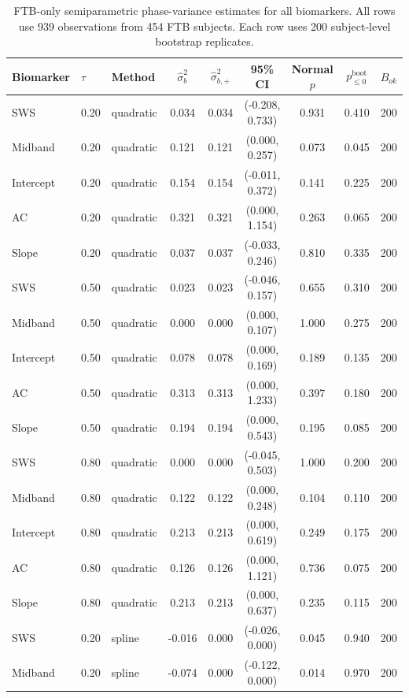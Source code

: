 \begin{table}[!htbp]
\centering
\caption{FTB-only semiparametric phase-variance estimates for all biomarkers. All rows use 939 observations from 454 FTB subjects. Each row uses 200 subject-level bootstrap replicates.}
\label{tab:ftb_semiparametric_phase_variance_summary}
\scriptsize
\begin{tabular}{lllcccccc}
\toprule
Biomarker & \(\tau\) & Method & \(\widehat\sigma_b^2\) & \(\widehat\sigma_{b,+}^2\) & 95\% CI & Normal \(p\) & \(p_{\le 0}^{\mathrm{boot}}\) & \(B_{ok}\) \\
\midrule
SWS & 0.20 & quadratic & 0.034 & 0.034 & (-0.208, 0.733) & 0.931 & 0.410 & 200 \\
Midband & 0.20 & quadratic & 0.121 & 0.121 & (0.000, 0.257) & 0.073 & 0.045 & 200 \\
Intercept & 0.20 & quadratic & 0.154 & 0.154 & (-0.011, 0.372) & 0.141 & 0.225 & 200 \\
AC & 0.20 & quadratic & 0.321 & 0.321 & (0.000, 1.154) & 0.263 & 0.065 & 200 \\
Slope & 0.20 & quadratic & 0.037 & 0.037 & (-0.033, 0.246) & 0.810 & 0.335 & 200 \\
SWS & 0.50 & quadratic & 0.023 & 0.023 & (-0.046, 0.157) & 0.655 & 0.310 & 200 \\
Midband & 0.50 & quadratic & 0.000 & 0.000 & (0.000, 0.107) & 1.000 & 0.275 & 200 \\
Intercept & 0.50 & quadratic & 0.078 & 0.078 & (0.000, 0.169) & 0.189 & 0.135 & 200 \\
AC & 0.50 & quadratic & 0.313 & 0.313 & (0.000, 1.233) & 0.397 & 0.180 & 200 \\
Slope & 0.50 & quadratic & 0.194 & 0.194 & (0.000, 0.543) & 0.195 & 0.085 & 200 \\
SWS & 0.80 & quadratic & 0.000 & 0.000 & (-0.045, 0.503) & 1.000 & 0.200 & 200 \\
Midband & 0.80 & quadratic & 0.122 & 0.122 & (0.000, 0.248) & 0.104 & 0.110 & 200 \\
Intercept & 0.80 & quadratic & 0.213 & 0.213 & (0.000, 0.619) & 0.249 & 0.175 & 200 \\
AC & 0.80 & quadratic & 0.126 & 0.126 & (0.000, 1.121) & 0.736 & 0.075 & 200 \\
Slope & 0.80 & quadratic & 0.213 & 0.213 & (0.000, 0.637) & 0.235 & 0.115 & 200 \\
SWS & 0.20 & spline & -0.016 & 0.000 & (-0.026, 0.000) & 0.045 & 0.940 & 200 \\
Midband & 0.20 & spline & -0.074 & 0.000 & (-0.122, 0.000) & 0.014 & 0.970 & 200 \\

\end{tabular}
\end{table}
